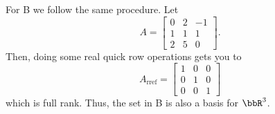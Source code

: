 \begin{questions}
\begin{solution}
    For B we follow the same procedure. Let
    \[
      A=\begin{bmatrix}%
        0&2&-1\\
        1&1&1\\
        2&5&0
    \end{bmatrix}.
    \]
    Then, doing some real quick row operations gets you to
    \[
      A_{\text{rref}}=%
      \begin{bmatrix}%
        1&0&0\\
        0&1&0\\
        0&0&1
      \end{bmatrix}
    \]
    which is full rank. Thus, the set in B is also a basis for $\bbR^3$.
  \end{solution}
\end{questions}

